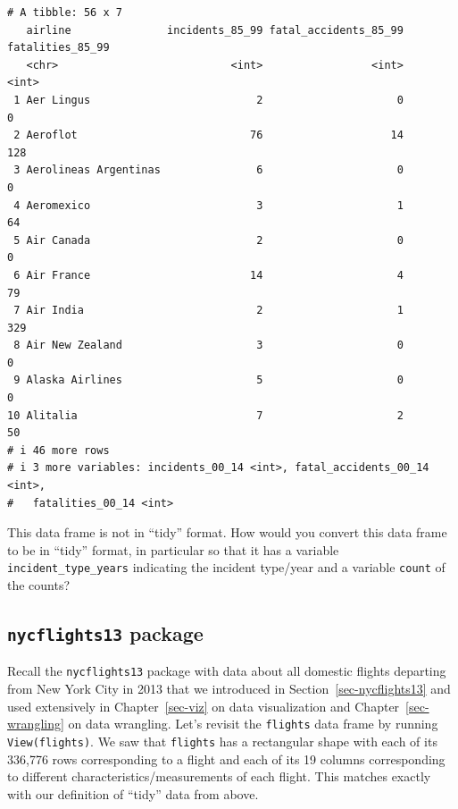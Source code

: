 \documentclass[
  letterpaper,
  DIV=11,
  numbers=noendperiod]{scrreprt}
\theoremstyle{definition}
\theoremstyle{remark}
\begin{document}
\begin{tcolorbox}
\begin{verbatim}
# A tibble: 56 x 7
   airline               incidents_85_99 fatal_accidents_85_99 fatalities_85_99
   <chr>                           <int>                 <int>            <int>
 1 Aer Lingus                          2                     0                0
 2 Aeroflot                           76                    14              128
 3 Aerolineas Argentinas               6                     0                0
 4 Aeromexico                          3                     1               64
 5 Air Canada                          2                     0                0
 6 Air France                         14                     4               79
 7 Air India                           2                     1              329
 8 Air New Zealand                     3                     0                0
 9 Alaska Airlines                     5                     0                0
10 Alitalia                            7                     2               50
# i 46 more rows
# i 3 more variables: incidents_00_14 <int>, fatal_accidents_00_14 <int>,
#   fatalities_00_14 <int>
\end{verbatim}

This data frame is not in ``tidy'' format. How would you convert this
data frame to be in ``tidy'' format, in particular so that it has a
variable \texttt{incident\_type\_years} indicating the incident
type/year and a variable \texttt{count} of the counts?

\end{tcolorbox}

\hypertarget{nycflights13-package-1}{%
\subsection{\texorpdfstring{\texttt{nycflights13}
package}{nycflights13 package}}\label{nycflights13-package-1}}

Recall the \texttt{nycflights13} package with data about all domestic
flights departing from New York City in 2013 that we introduced in
Section~\ref{sec-nycflights13} and used extensively in
Chapter~\ref{sec-viz} on data visualization and
Chapter~\ref{sec-wrangling} on data wrangling. Let's revisit the
\texttt{flights} data frame by running \texttt{View(flights)}. We saw
that \texttt{flights} has a rectangular shape with each of its 336,776
rows corresponding to a flight and each of its 19 columns corresponding
to different characteristics/measurements of each flight. This matches
exactly with our definition of ``tidy'' data from above.
\end{document}
